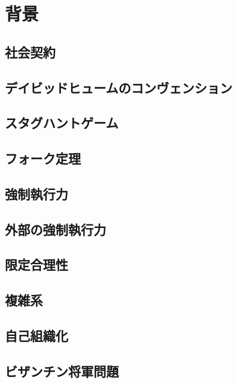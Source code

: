 \chapter{背景}
\section{社会契約}
\section{デイビッドヒュームのコンヴェンション}
\section{スタグハントゲーム}
\section{フォーク定理}
\section{強制執行力}
\section{外部の強制執行力}
\section{限定合理性}
\section{複雑系}
\section{自己組織化}
\section{ビザンチン将軍問題}
\section{}
